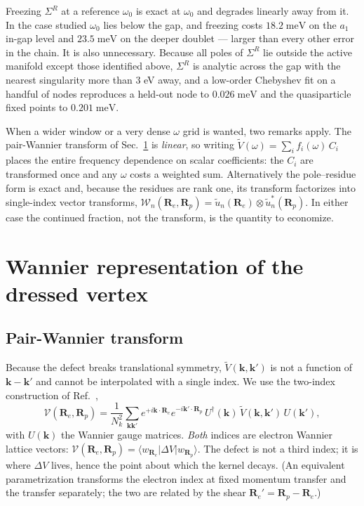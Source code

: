 \documentclass[aps,prx,reprint,superscriptaddress,nofootinbib,longbibliography]{revtex4-2}
\newcommand{\dV}{\Delta V}
\newcommand{\Vt}{\widetilde{V}}
\newcommand{\kk}{\mathbf{k}}
\newcommand{\RR}{\mathbf{R}}
\newcommand{\meV}{\;\mathrm{meV}}
\begin{document}
Freezing $\Sigma^R$ at a reference $\omega_0$ is exact at $\omega_0$ and
degrades linearly away from it. In the case studied $\omega_0$ lies below the
gap, and freezing costs $18.2\meV$ on the $a_1$ in-gap level and $23.5\meV$ on
the deeper doublet --- larger than every other error in the chain. It is also
unnecessary. Because all poles of $\Sigma^R$ lie outside the active manifold
except those identified above, $\Sigma^R$ is analytic across the gap with the
nearest singularity more than $3$ eV away, and a low-order Chebyshev fit on a
handful of nodes reproduces a held-out node to $0.026\meV$ and the
quasiparticle fixed points to $0.201\meV$.

When a wider window or a very dense $\omega$ grid is wanted, two remarks apply.
The pair-Wannier transform of Sec.~\ref{sec:wannier} is \emph{linear}, so
writing $\Vt(\omega) = \sum_i f_i(\omega)\, C_i$ places the entire frequency
dependence on scalar coefficients: the $C_i$ are transformed once and any
$\omega$ costs a weighted sum. Alternatively the pole--residue form is exact
and, because the residues are rank one, its transform factorizes into
single-index vector transforms,
$\mathcal{W}_n(\RR_e,\RR_p) = \tilde u_n(\RR_e) \otimes \tilde u_n^*(\RR_p)$.
In either case the continued fraction, not the transform, is the quantity to
economize.


\section{Wannier representation of the dressed vertex}
\label{sec:wannier}

\subsection{Pair-Wannier transform}

Because the defect breaks translational symmetry, $\Vt(\kk,\kk')$ is not a
function of $\kk-\kk'$ and cannot be interpolated with a single index. We use
the two-index construction of Ref.~,
\begin{equation}
  \mathcal{V}(\RR_e,\RR_p) = \frac{1}{N_k^2}\sum_{\kk\kk'}
  e^{+i\kk\cdot\RR_e} e^{-i\kk'\cdot\RR_p}\,
  U^{\dagger}(\kk)\, \Vt(\kk,\kk')\, U(\kk'),
  \label{eq:pairwannier}
\end{equation}
with $U(\kk)$ the Wannier gauge matrices. \emph{Both} indices are electron
Wannier lattice vectors: $\mathcal{V}(\RR_e,\RR_p) =
\langle w_{\RR_e}|\dV|w_{\RR_p}\rangle$. The defect is not a third index; it is
where $\dV$ lives, hence the point about which the kernel decays. (An
equivalent parametrization transforms the electron index at fixed momentum
transfer and the transfer separately; the two are related by the shear
$\RR_e' = \RR_p - \RR_e$.)
\end{document}
